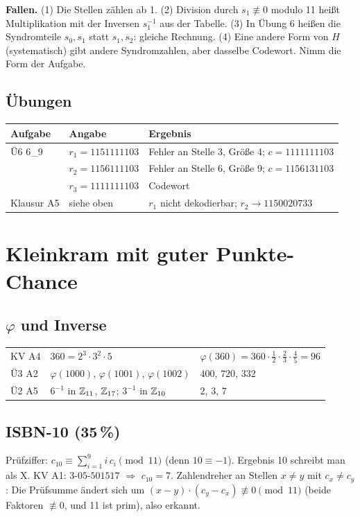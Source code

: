 \begin{achtung}
\textbf{Fallen.} (1) Die Stellen zählen ab 1. (2) Division durch $s_1 \not\equiv 0$ modulo 11 heißt Multiplikation mit der Inversen $s_1^{-1}$ aus der Tabelle.
(3) In Übung 6 heißen die Syndromteile $s_0, s_1$ statt $s_1, s_2$: gleiche Rechnung.
(4) Eine andere Form von $H$ (systematisch) gibt andere Syndromzahlen, aber dasselbe Codewort. Nimm die Form der Aufgabe.
\end{achtung}

\subsection*{Übungen}
\begin{tabular}{@{}lll@{}}
\toprule
Aufgabe & Angabe & Ergebnis\\
\midrule
Ü6 6\_9 & $r_1 = 1151111103$ & Fehler an Stelle 3, Größe 4; $c = 1111111103$\\
 & $r_2 = 1156111103$ & Fehler an Stelle 6, Größe 9; $c = 1156131103$\\
 & $r_3 = 1111111103$ & Codewort\\
Klausur A5 & siehe oben & $r_1$ nicht dekodierbar; $r_2 \to 1150020733$\\
\bottomrule
\end{tabular}

\section{Kleinkram mit guter Punkte-Chance}
\subsection*{$\varphi$ und Inverse}
\begin{tabular}{@{}lll@{}}
\toprule
KV A4 & $360 = 2^3 \cdot 3^2 \cdot 5$ & $\varphi(360) = 360 \cdot \frac12 \cdot \frac23 \cdot \frac45 = 96$\\
Ü3 A2 & $\varphi(1000)$, $\varphi(1001)$, $\varphi(1002)$ & $400$, $720$, $332$\\
Ü2 A5 & $6^{-1}$ in $\mathbb{Z}_{11}$, $\mathbb{Z}_{17}$; $3^{-1}$ in $\mathbb{Z}_{10}$ & $2$, $3$, $7$\\
\bottomrule
\end{tabular}

\subsection*{ISBN-10 (35\,\%)}
Prüfziffer: $c_{10} \equiv \sum_{i=1}^{9} i\,c_i \pmod{11}$ (denn $10 \equiv -1$). Ergebnis 10 schreibt man als X.
KV A1: $3\text{-}05\text{-}501517$ $\Rightarrow$ $c_{10} = 7$.
Zahlendreher an Stellen $x \ne y$ mit $c_x \ne c_y$: Die Prüfsumme ändert sich um $(x - y) \cdot (c_y - c_x) \not\equiv 0 \pmod{11}$ (beide Faktoren $\not\equiv 0$, und 11 ist prim), also erkannt.

